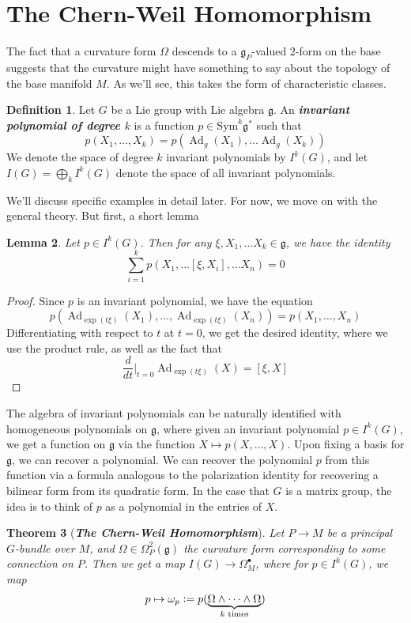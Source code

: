 \documentclass[psamsfonts, 12pt]{amsart}
\newtheorem{thm}{Theorem}[section]
\newtheorem{lem}[thm]{Lemma}
\theoremstyle{definition}
\newtheorem{defn}[thm]{Definition}
\theoremstyle{remark}
\newcommand{\ib}[1]{\textbf{\textit{#1}}}
\newcommand{\g}{\mathfrak{g}}
\newcommand{\defeq}{\vcentcolon=}
\DeclareMathOperator{\Ad}{Ad}
\begin{document}
\section{The Chern-Weil Homomorphism}
%
The fact that a curvature form $\Omega$ descends to a $\g_P$-valued $2$-form on
the base suggests that the curvature might have something to say about the topology
of the base manifold $M$. As we'll see, this takes the form of characteristic
classes.
%
\begin{defn}
Let $G$ be a Lie group with Lie algebra $\g$. An \ib{invariant polynomial of degree $k$}
is a function $p \in \mathrm{Sym}^k\g^*$ such that
\[
p(X_1, \ldots, X_k) = p(\Ad_g(X_1), \ldots \Ad_g(X_k))
\]
We denote the space of degree $k$ invariant polynomials by $I^k(G)$, and
let $I(G) = \bigoplus_k I^k(G)$ denote the space of all invariant polynomials.
\end{defn}
%
We'll discuss specific examples in detail later. For now, we move on with the general
theory. But first, a short lemma
%
\begin{lem}
Let $p \in I^k(G)$. Then for any $\xi, X_1, \ldots X_k \in \g$, we have the identity
\[
\sum_{i=1}^k p(X_1, \ldots [\xi, X_i], \ldots X_n) = 0
\]
\end{lem}
%
\begin{proof}
Since $p$ is an invariant polynomial, we have the equation
\[
p(\Ad_{\exp(t\xi)}(X_1),\ldots,\Ad_{\exp(t\xi)}(X_n)) = p(X_1,\ldots,X_n)
\]
Differentiating with respect to $t$ at $t=0$, we get the desired identity, where
we use the product rule, as well as the fact that
\[
\frac{d}{dt}\bigg\vert_{t=0}\Ad_{\exp(t\xi)}(X) = [\xi,X]
\]
\end{proof}
%
The algebra of invariant polynomials can be naturally identified with homogeneous
polynomials on $\g$, where given an invariant polynomial $p \in I^k(G)$, we get a
function on $\g$ via the function $X \mapsto p(X, \ldots, X)$. Upon fixing a basis
for $\g$, we can recover a polynomial. We can recover the polynomial $p$ from this
function via a formula analogous to the polarization  identity for recovering a bilinear
form from its quadratic form. In the case that $G$ is a matrix group, the idea
is to think of $p$ as a polynomial in the entries of $X$.
%
\begin{thm}[\ib{The Chern-Weil Homomorphism}]
Let $P \to M$ be a principal $G$-bundle over $M$, and $\Omega \in \Omega^2_P(\g)$
the curvature form corresponding to some connection on $P$. Then we get a map
$I(G) \to \Omega^\bullet_M$, where for $p \in I^k(G)$, we map
\[
p \mapsto \omega_p \defeq
p(\underbrace{\Omega \wedge \cdots \wedge \Omega}_{k \text{ times}})
\]
\end{thm}
\end{document}
